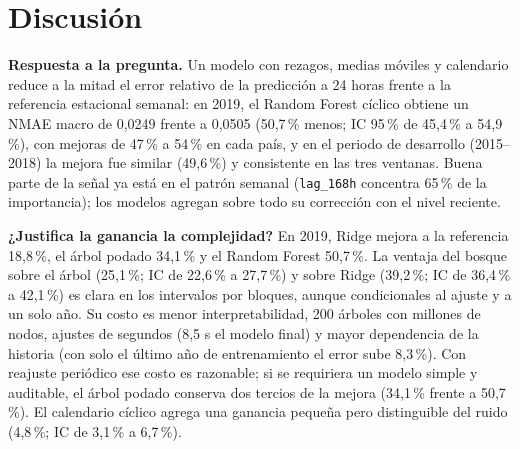 \section{Discusión}

\textbf{Respuesta a la pregunta.} Un modelo con rezagos, medias móviles y calendario reduce a la mitad el error relativo de la predicción a 24 horas frente a la referencia estacional semanal: en 2019, el Random Forest cíclico obtiene un NMAE macro de 0,0249 frente a 0,0505 (50,7\,\% menos; IC 95\,\% de 45,4\,\% a 54,9\,\%), con mejoras de 47\,\% a 54\,\% en cada país, y en el periodo de desarrollo (2015--2018) la mejora fue similar (49,6\,\%) y consistente en las tres ventanas. Buena parte de la señal ya está en el patrón semanal (\texttt{lag\_168h} concentra 65\,\% de la importancia); los modelos agregan sobre todo su corrección con el nivel reciente.

\textbf{¿Justifica la ganancia la complejidad?} En 2019, Ridge mejora a la referencia 18,8\,\%, el árbol podado 34,1\,\% y el Random Forest 50,7\,\%. La ventaja del bosque sobre el árbol (25,1\,\%; IC de 22,6\,\% a 27,7\,\%) y sobre Ridge (39,2\,\%; IC de 36,4\,\% a 42,1\,\%) es clara en los intervalos por bloques, aunque condicionales al ajuste y a un solo año. Su costo es menor interpretabilidad, 200 árboles con millones de nodos, ajustes de segundos (8,5 s el modelo final) y mayor dependencia de la historia (con solo el último año de entrenamiento el error sube 8,3\,\%). Con reajuste periódico ese costo es razonable; si se requiriera un modelo simple y auditable, el árbol podado conserva dos tercios de la mejora (34,1\,\% frente a 50,7\,\%). El calendario cíclico agrega una ganancia pequeña pero distinguible del ruido (4,8\,\%; IC de 3,1\,\% a 6,7\,\%).

